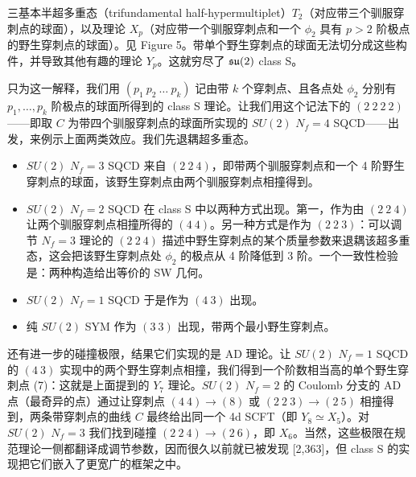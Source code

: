 三基本半超多重态（trifundamental half-hypermultiplet）$T_2$（对应带三个驯服穿刺点的球面），以及理论 $X_p$（对应带一个驯服穿刺点和一个 $\phi_2$ 具有 $p>2$ 阶极点的野生穿刺点的球面）。见 Figure 5。带单个野生穿刺点的球面无法切分成这些构件，并导致其他有趣的理论 $Y_p$。这就穷尽了 $\mathfrak{su}(2)$ class S。

 只为这一解释，我们用 $(p_1\ p_2\ \ldots\ p_k)$ 记由带 $k$ 个穿刺点、且各点处 $\phi_2$ 分别有 $p_1,\ldots,p_k$ 阶极点的球面所得到的 class S 理论。让我们用这个记法下的 $(2\ 2\ 2\ 2)$------即取 $C$ 为带四个驯服穿刺点的球面所实现的 $SU(2)$ $N_f=4$ SQCD------出发，来例示上面两类效应。我们先退耦超多重态。
\begin{itemize}[leftmargin=2em,itemsep=2pt,topsep=2pt]
  \item $SU(2)$ $N_f=3$ SQCD 来自 $(2\ 2\ 4)$，即带两个驯服穿刺点和一个 4 阶野生穿刺点的球面，该野生穿刺点由两个驯服穿刺点相撞得到。
  \item $SU(2)$ $N_f=2$ SQCD 在 class S 中以两种方式出现。第一，作为由 $(2\ 2\ 4)$ 让两个驯服穿刺点相撞所得的 $(4\ 4)$。另一种方式是作为 $(2\ 2\ 3)$：可以调节 $N_f=3$ 理论的 $(2\ 2\ 4)$ 描述中野生穿刺点的某个质量参数来退耦该超多重态，这会把该野生穿刺点处 $\phi_2$ 的极点从 4 阶降低到 3 阶。一个一致性检验是：两种构造给出等价的 SW 几何。
  \item $SU(2)$ $N_f=1$ SQCD 于是作为 $(4\ 3)$ 出现。
  \item 纯 $SU(2)$ SYM 作为 $(3\ 3)$ 出现，带两个最小野生穿刺点。
\end{itemize}

还有进一步的碰撞极限，结果它们实现的是 AD 理论。让 $SU(2)$ $N_f=1$ SQCD 的 $(4\ 3)$ 实现中的两个野生穿刺点相撞，我们得到一个阶数相当高的单个野生穿刺点 (7)：这就是上面提到的 $Y_7$ 理论。$SU(2)$ $N_f=2$ 的 Coulomb 分支的 AD 点（最奇异的点）通过让穿刺点 $(4\ 4)\to(8)$ 或 $(2\ 2\ 3)\to(2\ 5)$ 相撞得到，两条带穿刺点的曲线 $C$ 最终给出同一个 4d SCFT（即 $Y_8\simeq X_5$）。对 $SU(2)$ $N_f=3$ 我们找到碰撞 $(2\ 2\ 4)\to(2\ 6)$，即 $X_6$。当然，这些极限在规范理论一侧都翻译成调节参数，因而很久以前就已被发现 [2,363]，但 class S 的实现把它们嵌入了更宽广的框架之中。
